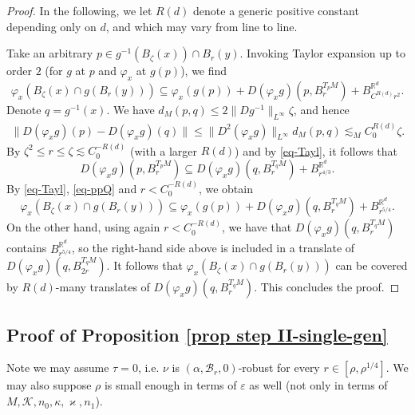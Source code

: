 \documentclass[11pt, leqno, fleqn]{amsart}
\def\eps{\varepsilon}
\newcommand{\margem}[1]{\marginpar{{\scriptsize {#1}}}}
\def\cB{          \mathcal B}
\def\clr{   \color{red}}
\def\clb{   \color{black}}
\def \R{{\mathbb R}}
\newcommand{\cK}{{\mathcal K}}
\newcommand{\aryst}{\begin{eqnarray*}}
\newcommand{\earyst}{\end{eqnarray*}}
\theoremstyle{definition}
\theoremstyle{definition}
\begin{document}
     	\begin{proof}
     		In the following, we let  $R(d)$ denote a generic positive constant  depending only on $d$, and which may vary from line to line. 
	
        Take an arbitrary $p\in g^{-1}(B_{\zeta}(x))\cap B_{r}(y)$. Invoking Taylor expansion  up to order $2$ (for $g$ at $p$  and $\varphi_x$ at $g(p)$), we find
     	\begin{equation}\label{eq-Tayl} 
     \varphi_x ( B_{\zeta}(x) \cap  g(B_{r}(y))) \subseteq \varphi_x(  g(p) ) + D(\varphi_x g)( p, B^{T_{p}M}_{r} )  + B^{\R^d}_{C^{R(d)}r^2}.
     	\end{equation}
	  Denote $q = g^{-1}(x)$. We have $d_M(p, q) \leq 2 \| Dg^{-1} \|_{L^\infty}   \zeta$, and hence
     \aryst
    \| D(\varphi_x g)(p) -  D(\varphi_x g)(q) \| \leq  \| D^2 (\varphi_x g)  \|_{L^\infty} d_M(p, q )\lesssim_{M}   C_0^{R(d)}\zeta.
     \earyst
     By      $\zeta^2\leq r\leq \zeta \lesssim C_0^{-R(d)} $ (with a larger $R(d)$) and by \eqref{eq-Tayl},
     it follows that 
          \begin{equation} \label{eq-ppQ}
     D(\varphi_x g)(p, B^{T_{p}M}_{r} ) \subseteq   D(\varphi_x g)(q, B^{T_{q}M}_{r} )    +B^{\R^d}_{r^{4/3} }.
          \end{equation}
     By  \eqref{eq-Tayl}, \eqref{eq-ppQ} and $r<C_0^{-R(d)}$, we obtain
        $$
           \varphi_x (B_{\zeta}(x) \cap  g(B_{r}(y))) \subseteq  \varphi_x ( g(p) ) +  D(\varphi_x g)(q, B^{T_{q}M}_{r} )  +B^{\R^d}_{r^{5/4}}.	
$$
      On the other hand, using again $r<C_0^{-R(d)}$, we have that $D(\varphi_x g)(q, B^{T_{q}M}_{r} )  $ contains $B^{\R^d}_{r^{5/4}}$, so the right-hand side above is included in a translate of $D(\varphi_x g)(q, B^{T_{q}M}_{2r} )  $. It follows that  $  \varphi_x (B_{\zeta}(x) \cap  g(B_{r}(y))) $
    can be covered by $R(d)$-many translates of  $D(\varphi_x g)(q, B^{T_{q}M}_{r} )  $.
  This concludes the proof.
 \end{proof}
 
 
 
 
 		\subsection{Proof of Proposition \ref{prop step II-single-gen}} 
		Note we may assume $\tau = 0$, i.e. $\nu$   is $(\alpha, \cB_{r}, 0)$-robust for every $r \in [\rho, \rho^{1/4}]$. We may also suppose $\rho$ is small enough in terms of $\eps$ as well (not only in terms of $M, \cK, n_{0}, \kappa, \varkappa, n_{1}$).  
		
\end{document}
